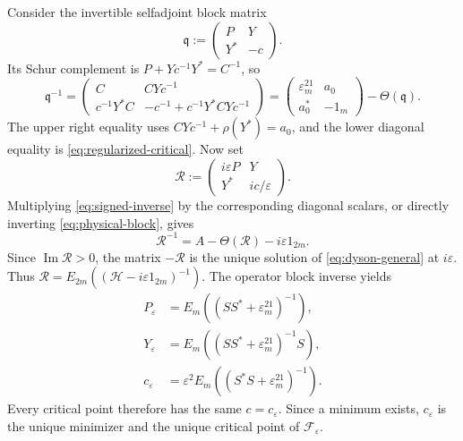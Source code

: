 Consider the invertible selfadjoint block matrix
\[
 \mathfrak q:=\begin{pmatrix}P&Y\\Y^*&-c\end{pmatrix}.
\]
Its Schur complement is $P+Yc^{-1}Y^*=C^{-1}$, so
\begin{equation}\label{eq:signed-inverse}
 \mathfrak q^{-1}=
 \begin{pmatrix}
 C&CYc^{-1}\\
 c^{-1}Y^*C&-c^{-1}+c^{-1}Y^*CYc^{-1}
 \end{pmatrix}
 =\begin{pmatrix}\varepsilon^21_m&a_0\\a_0^*&-1_m\end{pmatrix}
       -\Theta(\mathfrak q).
\end{equation}
The upper right equality uses $CYc^{-1}+\rho(Y^*)=a_0$, and the lower diagonal equality is \eqref{eq:regularized-critical}.
Now set
\begin{equation}\label{eq:physical-block}
 \mathscr R:=\begin{pmatrix}i\varepsilon P&Y\\Y^*&ic/\varepsilon\end{pmatrix}.
\end{equation}
Multiplying \eqref{eq:signed-inverse} by the corresponding diagonal scalars, or directly inverting \eqref{eq:physical-block}, gives
\[
 \mathscr R^{-1}=A-\Theta(\mathscr R)-i\varepsilon 1_{2m}.
\]
Since $\operatorname{Im}\mathscr R>0$, the matrix $-\mathscr R$ is the unique solution of \eqref{eq:dyson-general} at $i\varepsilon$.
Thus $\mathscr R=E_{2m}((\mathscr H-i\varepsilon 1_{2m})^{-1})$.
The operator block inverse yields
\begin{equation}\label{eq:regularized-optimizer}
 \begin{split}
 P_\varepsilon&=E_m((SS^*+\varepsilon^21_m)^{-1}),\\
 Y_\varepsilon&=E_m((SS^*+\varepsilon^21_m)^{-1}S),\\
 c_\varepsilon&=\varepsilon^2E_m((S^*S+\varepsilon^21_m)^{-1}).
 \end{split}
\end{equation}
Every critical point therefore has the same $c=c_\varepsilon$.
Since a minimum exists, $c_\varepsilon$ is the unique minimizer and the unique critical point of $\mathcal F_\varepsilon$.

